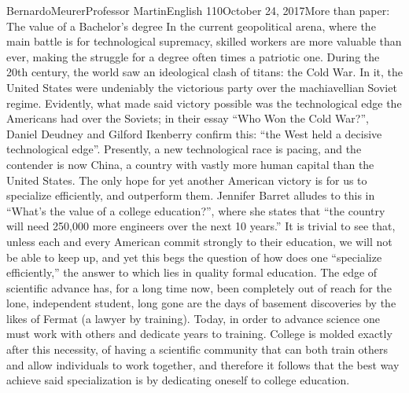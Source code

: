 \documentclass[12pt,letterpaper]{article}
\begin{document}
\begin{mla}{Bernardo}{Meurer}{Professor Martin}{English 110}{October 24, 2017}{More than paper: The value of a Bachelor's degree}
        In the current geopolitical arena, where the main battle is for technological supremacy, skilled workers are more valuable than ever, making the struggle for a degree often times a patriotic one. During the 20th century, the world saw an ideological clash of titans: the Cold War. In it, the United States were undeniably the victorious party over the machiavellian Soviet regime. Evidently, what made said victory possible was the technological edge the Americans had over the Soviets; in their essay ``Who Won the Cold War?'', Daniel Deudney and Gilford Ikenberry confirm this: ``the West held a decisive technological edge''. Presently, a new technological race is pacing, and the contender is now China, a country with vastly more human capital than the United States. The only hope for yet another American victory is for us to specialize efficiently, and outperform them. Jennifer Barret alludes to this in ``What's the value of a college education?'', where she states that ``the country will need 250,000 more engineers over the next 10 years.'' It is trivial to see that, unless each and every American commit strongly to their education, we will not be able to keep up, and yet this begs the question of how does one ``specialize efficiently,'' the answer to which lies in quality formal education. The edge of scientific advance has, for a long time now, been completely out of reach for the lone, independent student, long gone are the days of basement discoveries by the likes of Fermat (a lawyer by training). Today, in order to advance science one must work with others and dedicate years to training. College is molded exactly after this necessity, of having a scientific community that can both train others and allow individuals to work together, and therefore it follows that the best way achieve said specialization is by dedicating oneself to college education.
    

\end{mla}
\end{document}
